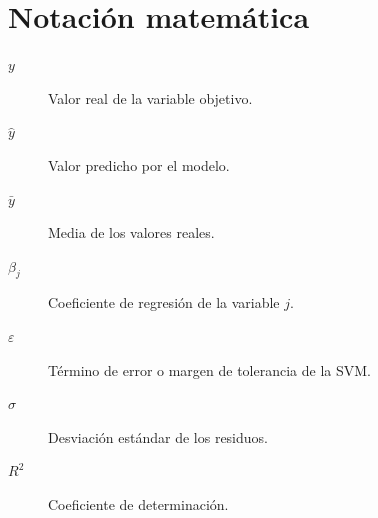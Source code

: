 \section*{Notación matemática}

\begin{description}
    \item[$y$] Valor real de la variable objetivo.
    \item[$\hat{y}$] Valor predicho por el modelo.
    \item[$\bar{y}$] Media de los valores reales.
    \item[$\beta_j$] Coeficiente de regresión de la variable $j$.
    \item[$\varepsilon$] Término de error o margen de tolerancia de la SVM.
    \item[$\sigma$] Desviación estándar de los residuos.
    \item[$R^2$] Coeficiente de determinación.
\end{description}

\clearpage
